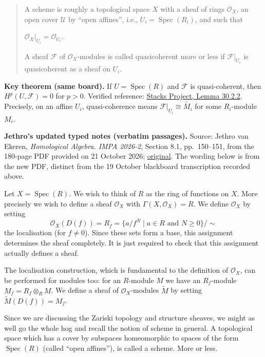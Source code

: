 \begin{quote}
A scheme is roughly a topological space $X$ with a sheaf of rings $\mathcal O_X$, an open cover $\mathcal U$ by ``open affines'', i.e., $U_i = \operatorname{Spec}(R_i)$, and such that

$\mathcal O_X|_{U_i} = \mathcal O_{U_i}$.

A sheaf $\mathcal F$ of $\mathcal O_X$-modules is called quasicoherent more or less if $\mathcal F|_{U_i}$ is quasicoherent as a sheaf on $U_i$.
\end{quote}

\noindent
{\bf Key theorem (same board).} If $U=\operatorname{Spec}(R)$ and $\mathcal F$ is quasi-coherent, then $H^p(U,\mathcal F)=0$ for $p>0$. Verified reference: \href{https://stacks.math.columbia.edu/tag/01XB}{Stacks Project, Lemma 30.2.2}. Precisely, on an affine $U_i$, quasi-coherence means $\mathcal F|_{U_i}\cong\widetilde{M_i}$ for some $R_i$-module $M_i$.

\medskip

\medskip\noindent
{\bf Jethro's updated typed notes (verbatim passages).}
Source: Jethro van Ekeren, \emph{Homological Algebra. IMPA 2026-2},
Section 8.1, pp.~150--151, from the 180-page PDF provided
on 21 October 2026;
\href{https://w3.impa.br/~jethro/2026-2/ah-current.pdf}{original}.
The wording below is from the new PDF, distinct from the
19 October blackboard transcription recorded above.

Let $X=\operatorname{Spec}(R)$. We wish to think of $R$ as the ring of functions on $X$. More precisely we wish to define a sheaf $\mathcal O_X$ with $\Gamma(X,\mathcal O_X)=R$. We define $\mathcal O_X$ by setting
\[\mathcal O_X(D(f))=R_f=\{a/f^N\mid a\in R\text{ and }N\geq0\}/\sim\]
the localisation (for $f\neq0$). Since these sets form a base, this assignment determines the sheaf completely. It is just required to check that this assignment actually defines a sheaf.

The localisation construction, which is fundamental to the definition of $\mathcal O_X$, can be performed for modules too: for an $R$-module $M$ we have an $R_f$-module $M_f=R_f\otimes_R M$. We define a sheaf of $\mathcal O_X$-modules $\widetilde M$ by setting $\widetilde M(D(f))=M_f$.

Since we are discussing the Zariski topology and structure sheaves, we might as well go the whole hog and recall the notion of scheme in general. A topological space which has a cover by subspaces homeomorphic to spaces of the form $\operatorname{Spec}(R)$ (called ``open affines''), is called a scheme. More or less.

